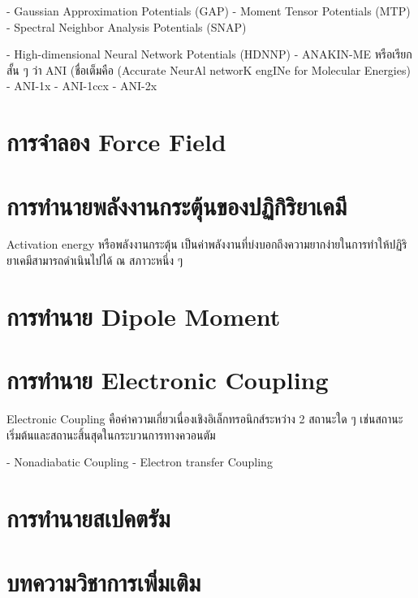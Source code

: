- Gaussian Approximation Potentials (GAP)\cite{bartok2010}
- Moment Tensor Potentials (MTP)\cite{shapeev2016}
- Spectral Neighbor Analysis Potentials (SNAP)\cite{thompson2015}


- High-dimensional Neural Network Potentials (HDNNP)\cite{behler2007}
- ANAKIN-ME หรือเรียกสั้น ๆ ว่า ANI (ชื่อเต็มคือ (Accurate NeurAl networK engINe for Molecular Energies)
    - ANI-1x\cite{smith2017}
    - ANI-1ccx\cite{smith2018}
    - ANI-2x\cite{smith2019}

\section{การจำลอง Force Field}

\section{การทำนายพลังงานกระตุ้นของปฏิกิริยาเคมี}

Activation energy หรือพลังงานกระตุ้น เป็นค่าพลังงานที่บ่งบอกถึงความยากง่ายในการทำให้ปฏิริยาเคมีสามารถดำเนินไปได้ ณ สภาวะหนึ่ง ๆ

\section{การทำนาย Dipole Moment}

\section{การทำนาย Electronic Coupling}

Electronic Coupling คือค่าความเกี่ยวเนื่องเชิงอิเล็กทรอนิกส์ระหว่าง 2 สถานะใด ๆ เช่นสถานะเริ่มต้นและสถานะสิ้นสุดในกระบวนการทางควอนตัม

- Nonadiabatic Coupling
- Electron transfer Coupling

\section{การทำนายสเปคตรัม}


\section{บทความวิชาการเพิ่มเติม}

